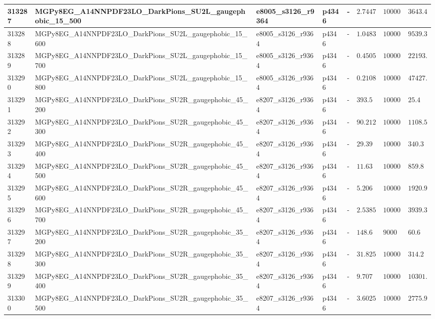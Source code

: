 \begin{table}[!hbtp]
{\begin{tabular}{llllllll}
    \hline
    313287 & MGPy8EG\_A14NNPDF23LO\_DarkPions\_SU2L\_gaugephobic\_15\_500 & e8005\_s3126\_r9364 & p4346 & - & $2.7447$ & $10000$ & $3643.4$\\
    \hline
    313288 & MGPy8EG\_A14NNPDF23LO\_DarkPions\_SU2L\_gaugephobic\_15\_600 & e8005\_s3126\_r9364 & p4346 & - & $1.0483$ & $10000$ & $9539.3$\\
    \hline
    313289 & MGPy8EG\_A14NNPDF23LO\_DarkPions\_SU2L\_gaugephobic\_15\_700 & e8005\_s3126\_r9364 & p4346 & - & $0.45058$ & $10000$ & $22193.6$\\
    \hline
    313290 & MGPy8EG\_A14NNPDF23LO\_DarkPions\_SU2L\_gaugephobic\_15\_800 & e8005\_s3126\_r9364 & p4346 & - & $0.21085$ & $10000$ & $47427.1$\\
    \hline
    313291 & MGPy8EG\_A14NNPDF23LO\_DarkPions\_SU2R\_gaugephobic\_45\_200 & e8207\_s3126\_r9364 & p4346 & - & $393.5$ & $10000$ & $25.4$\\
    \hline
    313292 & MGPy8EG\_A14NNPDF23LO\_DarkPions\_SU2R\_gaugephobic\_45\_300 & e8207\_s3126\_r9364 & p4346 & - & $90.212$ & $100000$ & $1108.5$\\
    \hline
    313293 & MGPy8EG\_A14NNPDF23LO\_DarkPions\_SU2R\_gaugephobic\_45\_400 & e8207\_s3126\_r9364 & p4346 & - & $29.39$ & $10000$ & $340.3$\\
    \hline
    313294 & MGPy8EG\_A14NNPDF23LO\_DarkPions\_SU2R\_gaugephobic\_45\_500 & e8207\_s3126\_r9364 & p4346 & - & $11.63$ & $10000$ & $859.8$\\
    \hline
    313295 & MGPy8EG\_A14NNPDF23LO\_DarkPions\_SU2R\_gaugephobic\_45\_600 & e8207\_s3126\_r9364 & p4346 & - & $5.206$ & $10000$ & $1920.9$\\
    \hline
    313296 & MGPy8EG\_A14NNPDF23LO\_DarkPions\_SU2R\_gaugephobic\_45\_700 & e8207\_s3126\_r9364 & p4346 & - & $2.5385$ & $10000$ & $3939.3$\\
    \hline
    313297 & MGPy8EG\_A14NNPDF23LO\_DarkPions\_SU2R\_gaugephobic\_35\_200 & e8207\_s3126\_r9364 & p4346 & - & $148.6$ & $9000$ & $60.6$\\
    \hline
    313298 & MGPy8EG\_A14NNPDF23LO\_DarkPions\_SU2R\_gaugephobic\_35\_300 & e8207\_s3126\_r9364 & p4346 & - & $31.825$ & $10000$ & $314.2$\\
    \hline
    313299 & MGPy8EG\_A14NNPDF23LO\_DarkPions\_SU2R\_gaugephobic\_35\_400 & e8207\_s3126\_r9364 & p4346 & - & $9.707$ & $100000$ & $10301.8$\\
    \hline
    313300 & MGPy8EG\_A14NNPDF23LO\_DarkPions\_SU2R\_gaugephobic\_35\_500 & e8207\_s3126\_r9364 & p4346 & - & $3.6025$ & $10000$ & $2775.9$\\

\end{tabular}}
\end{table}
